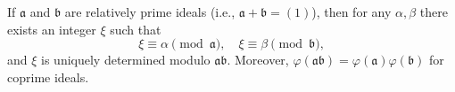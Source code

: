 If $\mathfrak{a}$ and $\mathfrak{b}$ are relatively prime ideals (i.e., $\mathfrak{a} + \mathfrak{b} = (1)$), then for any $\alpha, \beta$ there exists an integer $\xi$ such that
$$\xi \equiv \alpha \pmod{\mathfrak{a}}, \quad \xi \equiv \beta \pmod{\mathfrak{b}},$$
and $\xi$ is uniquely determined modulo $\mathfrak{a}\mathfrak{b}$. Moreover, $\varphi(\mathfrak{a}\mathfrak{b}) = \varphi(\mathfrak{a})\varphi(\mathfrak{b})$ for coprime ideals.
